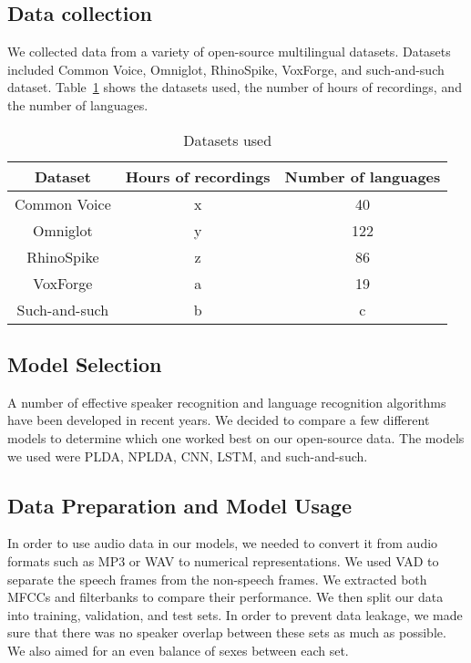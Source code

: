 \documentclass{llncs}
\begin{document}
\subsection{Data collection}
We collected data from a variety of open-source multilingual datasets. Datasets included Common Voice, Omniglot, RhinoSpike, VoxForge, and such-and-such dataset. Table~\ref{table2} shows the datasets used, the number of hours of recordings, and the number of languages.

\begin{table}
\caption{Datasets used}\label{table2}
\begin{center}
\begin{tabular}{ c c c }
\toprule
Dataset & Hours of recordings & Number of languages\\
\midrule
Common Voice & x & 40 \\
Omniglot & y & 122 \\
RhinoSpike & z & 86 \\
VoxForge & a & 19 \\
Such-and-such & b & c \\
\bottomrule
\end{tabular}
\end{center}
\end{table}

\subsection{Model Selection}
A number of effective speaker recognition and language recognition algorithms have been developed in recent years. We decided to compare a few different models to determine which one worked best on our open-source data. The models we used were PLDA, NPLDA, CNN, LSTM, and such-and-such.

\subsection{Data Preparation and Model Usage}
In order to use audio data in our models, we needed to convert it from audio formats such as MP3 or WAV to numerical representations. We used VAD to separate the speech frames from the non-speech frames. We extracted both MFCCs and filterbanks to compare their performance. We then split our data into training, validation, and test sets. In order to prevent data leakage, we made sure that there was no speaker overlap between these sets as much as possible. We also aimed for an even balance of sexes between each set.
\end{document}
